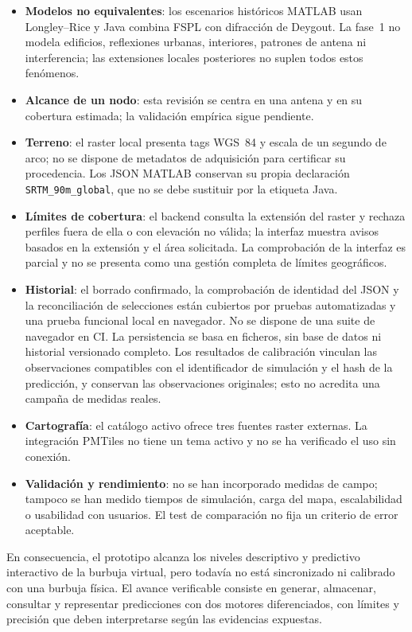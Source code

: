 \begin{itemize}
  \item \textbf{Modelos no equivalentes}: los escenarios históricos MATLAB usan
    Longley--Rice y Java combina FSPL con difracción de Deygout. La fase~1 no modela
    edificios, reflexiones urbanas, interiores, patrones de antena ni interferencia; las
    extensiones locales posteriores no suplen todos estos fenómenos.
  \item \textbf{Alcance de un nodo}: esta revisión se centra en una antena y en su
    cobertura estimada; la validación empírica sigue pendiente.
  \item \textbf{Terreno}: el raster local presenta tags WGS~84 y escala de un segundo
    de arco; no se dispone de metadatos de adquisición para certificar su procedencia.
    Los JSON MATLAB conservan su propia declaración
    \texttt{SRTM\_90m\_global}, que no se debe sustituir por la etiqueta Java.
  \item \textbf{Límites de cobertura}: el backend consulta la extensión del raster y rechaza
    perfiles fuera de ella o con elevación no válida; la interfaz muestra avisos basados en
    la extensión y el área solicitada. La comprobación de la interfaz es parcial y no se
    presenta como una gestión completa de límites geográficos.
  \item \textbf{Historial}: el borrado confirmado, la comprobación de identidad del JSON y
    la reconciliación de selecciones están cubiertos por pruebas automatizadas y una prueba
    funcional local en navegador. No se dispone de una suite de navegador en CI. La
    persistencia se basa en ficheros, sin base de datos ni historial versionado
    completo. Los resultados de calibración vinculan las observaciones compatibles
    con el identificador de simulación y el hash de la predicción, y conservan
    las observaciones originales; esto no acredita una campaña de medidas reales.
  \item \textbf{Cartografía}: el catálogo activo ofrece tres fuentes raster externas. La
    integración PMTiles no tiene un tema activo y no se ha verificado el uso sin conexión.
  \item \textbf{Validación y rendimiento}: no se han incorporado medidas de campo; tampoco
    se han medido tiempos de simulación, carga del mapa, escalabilidad o usabilidad con
    usuarios. El test de comparación no fija un criterio de error aceptable.
\end{itemize}

En consecuencia, el prototipo alcanza los niveles descriptivo y predictivo interactivo de
la burbuja virtual, pero todavía no está sincronizado ni calibrado con una burbuja física.
El avance verificable consiste en generar, almacenar, consultar y representar predicciones
con dos motores diferenciados, con límites y precisión que deben interpretarse según las
evidencias expuestas.

